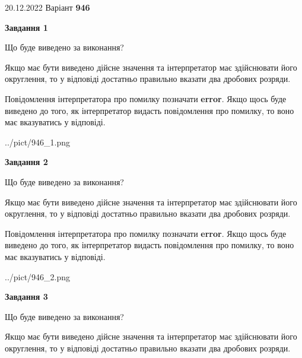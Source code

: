 \documentclass[12pt, ukrainian]{article}
\begin{document}
{20.12.2022 Варіант \No \textbf { 946 }\par}
{
\begin {Large}

{\begin {center}\textbf{Завдання 1}\end {center}}\par
Що буде виведено за виконання? \par

Якщо має бути виведено дійсне значення та інтерпретатор має здійснювати його округлення, 
то у відповіді достатньо правильно вказати два дробових розряди.

Повідомлення інтерпретатора про помилку позначати \textbf{error}.
Якщо щось буде виведено до того, як інтерпретатор видасть повідомлення про помилку, 
то воно має вказуватись у відповіді. \par

\begin{center}
	{../pict/946_1.png}
\end{center}
\newpage

{\begin {center}\textbf{Завдання 2}\end {center}}\par
Що буде виведено за виконання? \par

Якщо має бути виведено дійсне значення та інтерпретатор має здійснювати його округлення, 
то у відповіді достатньо правильно вказати два дробових розряди.

Повідомлення інтерпретатора про помилку позначати \textbf{error}.
Якщо щось буде виведено до того, як інтерпретатор видасть повідомлення про помилку, 
то воно має вказуватись у відповіді. \par

\begin{center}
	{../pict/946_2.png}
\end{center}
\newpage

{\begin {center}\textbf{Завдання 3}\end {center}}\par
Що буде виведено за виконання? \par

Якщо має бути виведено дійсне значення та інтерпретатор має здійснювати його округлення, 
то у відповіді достатньо правильно вказати два дробових розряди.


\end{Large}}
\end{document}
